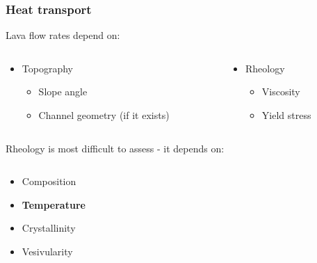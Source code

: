 \documentclass{beamer}
\begin{document}
\begin{frame}
  \frametitle{Heat transport}

  Lava flow rates depend on:

  \begin{columns}[t]

    \begin{column}{0.5\paperwidth}

      \begin{itemize}
      \item Topography \\
        \begin{itemize}
        \item Slope angle \\
        \item Channel geometry (if it exists) \\
        \end{itemize}
      \end{itemize}

    \end{column}

    \begin{column}{0.5\paperwidth}

    \begin{itemize}
    \item Rheology \\
      \begin{itemize}
      \item Viscosity \\
      \item Yield stress \\ 
      \end{itemize}
    \end{itemize}

  \end{column}

\end{columns}

  \vspace{0.5cm}
  
  Rheology is most difficult to assess - it depends on:

  \begin{columns}[t]

    \begin{column}{0.5\paperwidth}

      \begin{itemize}
      \item Composition \\
      \item \textbf{Temperature} \\
      \item Crystallinity \\
      \item Vesivularity \\
      \end{itemize}


\end{column}
\end{columns}
\end{frame}
\end{document}
